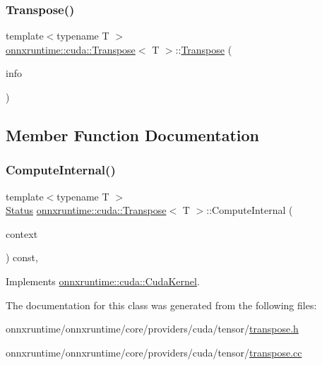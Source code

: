 \subsubsection{\texorpdfstring{Transpose()}{Transpose()}}
{\footnotesize\ttfamily template$<$typename T $>$ \\
\mbox{\hyperlink{classonnxruntime_1_1cuda_1_1Transpose}{onnxruntime\+::cuda\+::\+Transpose}}$<$ T $>$\+::\mbox{\hyperlink{classonnxruntime_1_1cuda_1_1Transpose}{Transpose}} (\begin{DoxyParamCaption}\item[{const \mbox{\hyperlink{classonnxruntime_1_1OpKernelInfo}{Op\+Kernel\+Info}} \&}]{info }\end{DoxyParamCaption})\hspace{0.3cm}{\ttfamily [inline]}}



\subsection{Member Function Documentation}
\mbox{\label{classonnxruntime_1_1cuda_1_1Transpose_a02f1e4c35b31f521b2bcafdc2a81128b}} 
\subsubsection{\texorpdfstring{Compute\+Internal()}{ComputeInternal()}}
{\footnotesize\ttfamily template$<$typename T $>$ \\
\mbox{\hyperlink{classonnxruntime_1_1common_1_1Status}{Status}} \mbox{\hyperlink{classonnxruntime_1_1cuda_1_1Transpose}{onnxruntime\+::cuda\+::\+Transpose}}$<$ T $>$\+::Compute\+Internal (\begin{DoxyParamCaption}\item[{\mbox{\hyperlink{classonnxruntime_1_1OpKernelContext}{Op\+Kernel\+Context}} $\ast$}]{context }\end{DoxyParamCaption}) const\hspace{0.3cm}{\ttfamily [override]}, {\ttfamily [virtual]}}



Implements \mbox{\hyperlink{classonnxruntime_1_1cuda_1_1CudaKernel_aca7af04ae448017d6023d30bba231ebb}{onnxruntime\+::cuda\+::\+Cuda\+Kernel}}.



The documentation for this class was generated from the following files\+:\begin{DoxyCompactItemize}
\item 
onnxruntime/onnxruntime/core/providers/cuda/tensor/\mbox{\hyperlink{cuda_2tensor_2transpose_8h}{transpose.\+h}}\item 
onnxruntime/onnxruntime/core/providers/cuda/tensor/\mbox{\hyperlink{cuda_2tensor_2transpose_8cc}{transpose.\+cc}}\end{DoxyCompactItemize}
